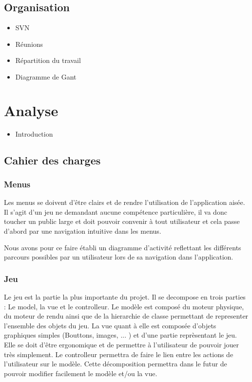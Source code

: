 \documentclass[]{report}
\begin{document}
	\section{Organisation}
		\begin{itemize}
			\item{SVN}
			\item{Réunions}
			\item{Répartition du travail}
			\item{Diagramme de Gant}
		\end{itemize}
	
	
\chapter{Analyse}
	\begin{itemize}
		\item{Introduction}
	\end{itemize}
	
	\section{Cahier des charges}
		\subsection{Menus}
		
		Les menus se doivent d'être clairs et de rendre l'utilisation de
		l'application aisée. Il s'agit d'un jeu ne demandant aucune compétence
		particulière, il va donc toucher un public large et doit pouvoir convenir à
		tout utilisateur et cela passe d'abord par une navigation intuitive dans les
		menus.
		
		Nous avons pour ce faire établi un diagramme d'activité reflettant les
		différents parcours possibles par un utilisateur lors de sa navigation dans
		l'application.
		
		\subsection{Jeu}
		
		Le jeu est la partie la plus importante du projet. Il se decompose en trois parties : Le model, la vue et le controlleur. Le modèle est composé du moteur physique, du moteur de rendu ainsi que de la hierarchie de classe permettant de representer l'ensemble des objets du jeu. La vue quant à elle est composée d'objets graphiques simples (Bouttons, images, ... ) et d'une partie reprèsentant le jeu. Elle se doit d'être ergonomique et de permettre à l'utilisateur de pouvoir jouer très simplement. Le controlleur permettra de faire le lien entre les actions de l'utilisateur sur le modèle. Cette décomposition permettra dans le futur de pouvoir modifier facilement le modèle et/ou la vue.
		
\end{document}
